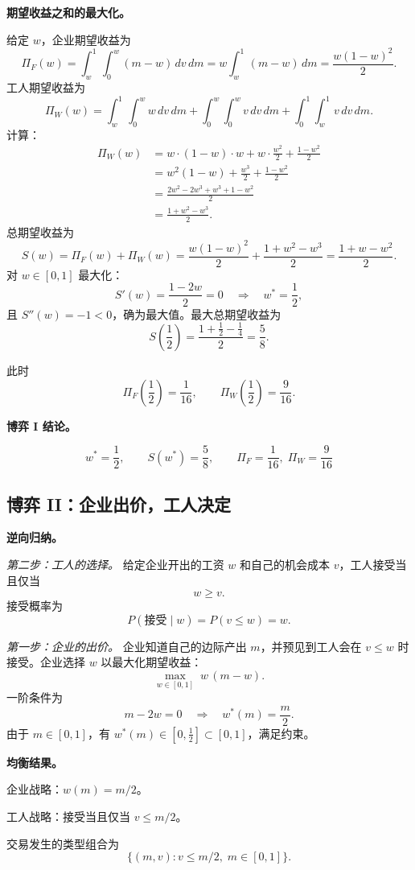 \textbf{期望收益之和的最大化。}

给定 $w$，企业期望收益为
\[
	\Pi_F(w)=\int_w^1\int_0^w (m-w)\,dv\,dm
	=w\int_w^1(m-w)\,dm
	=\frac{w(1-w)^2}{2}.
\]\indent
工人期望收益为
\[
	\Pi_W(w)=\int_w^1\int_0^w w\,dv\,dm
	+\int_0^w\int_0^w v\,dv\,dm
	+\int_0^1\int_w^1 v\,dv\,dm.
\]\indent
计算：
\[
\begin{aligned}
	\Pi_W(w)
	&=w\cdot(1-w)\cdot w
	+w\cdot\frac{w^2}{2}
	+\frac{1-w^2}{2}\\[4pt]
	&=w^2(1-w)+\frac{w^3}{2}+\frac{1-w^2}{2}\\[4pt]
	&=\frac{2w^2-2w^3+w^3+1-w^2}{2}\\[4pt]
	&=\frac{1+w^2-w^3}{2}.
\end{aligned}
\]\indent
总期望收益为
\[
	S(w)=\Pi_F(w)+\Pi_W(w)
	=\frac{w(1-w)^2}{2}+\frac{1+w^2-w^3}{2}
	=\frac{1+w-w^2}{2}.
\]\indent
对 $w\in[0,1]$ 最大化：
\[
	S'(w)=\frac{1-2w}{2}=0\quad\Longrightarrow\quad w^*=\frac12,
\]\indent
且 $S''(w)=-1<0$，确为最大值。最大总期望收益为
\[
	S\left(\frac12\right)=\frac{1+\tfrac12-\tfrac14}{2}=\frac58.
\]

此时
\[
	\Pi_F\left(\frac12\right)=\frac{1}{16},\qquad
	\Pi_W\left(\frac12\right)=\frac{9}{16}.
\]

\textbf{博弈 I 结论。}

\[
	\boxed{w^*=\frac12,\qquad S(w^*)=\frac58,\qquad
	\Pi_F=\frac{1}{16},\;\Pi_W=\frac{9}{16}}
\]

\subsection*{博弈 II：企业出价，工人决定}

\textbf{逆向归纳。}

\textit{第二步：工人的选择。}
给定企业开出的工资 $w$ 和自己的机会成本 $v$，工人接受当且仅当
\[
	w\ge v.
\]\indent
接受概率为
\[
	P(\text{接受}\mid w)=P(v\le w)=w.
\]

\textit{第一步：企业的出价。}
企业知道自己的边际产出 $m$，并预见到工人会在 $v\le w$ 时接受。企业选择 $w$ 以最大化期望收益：
\[
	\max_{w\in[0,1]}\; w\,(m-w).
\]\indent
一阶条件为
\[
	m-2w=0\quad\Longrightarrow\quad w^*(m)=\frac{m}{2}.
\]\indent
由于 $m\in[0,1]$，有 $w^*(m)\in[0,\tfrac12]\subset[0,1]$，满足约束。

\textbf{均衡结果。}

企业战略：$w(m)=m/2$。

工人战略：接受当且仅当 $v\le m/2$。

交易发生的类型组合为
\[
	\{(m,v):v\le m/2,\;m\in[0,1]\}.
\]

